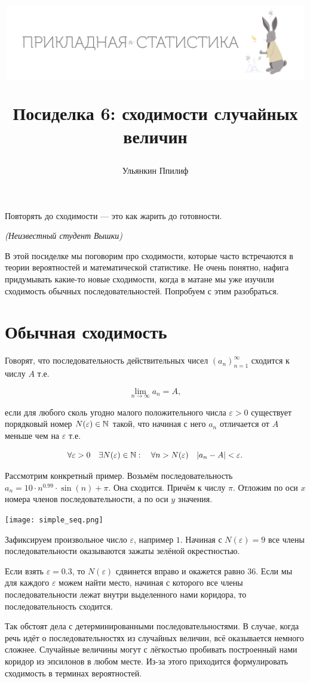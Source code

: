 \documentclass[12pt, a4paper, oneside]{article}
\title{
\begin{center} 
\includegraphics[width=0.99\textwidth]{logo.png}
\end{center}

Посиделка 6: сходимости случайных величин}
\date{ } %
\author{Ульянкин Ппилиф}
\begin{document}

\maketitle

\epigraph{Повторять до сходимости --- это как жарить до готовности.}{\textit{(Неизвестный студент Вышки)}}

В этой посиделке мы поговорим про сходимости, которые часто встречаются в теории вероятностей и математической статистике. Не очень понятно, нафига придумывать какие-то новые сходимости, когда в матане мы уже изучили сходимость обычных последовательностей. Попробуем с этим разобраться. 

\section{Обычная сходимость}

Говорят, что последовательность действительных чисел $(a_n)_{n=1}^{\infty}$ сходится к числу $A$ т.е.

\[ 
\lim_{n \to \infty} a_n = A,
\]

если для любого сколь угодно малого положительного числа $\varepsilon > 0$ существует порядковый номер $N(\varepsilon) \in \mathbb N$ такой, что начиная с него $a_n$ отличается от $A$ меньше чем на $\varepsilon$ т.е. 

\[
\forall \varepsilon > 0 \quad  \exists N(\varepsilon) \in \mathbb N : \quad  \forall n > N(\varepsilon) \quad |a_n - A| < \varepsilon.
\]

Рассмотрим конкретный пример. Возьмём последовательность $a_n = 10 \cdot n^{0.99} \cdot \sin(n) + \pi.$ Она сходится. Причём к числу $\pi$. Отложим по оси $x$ номера членов последовательности, а по оси $y$ значения. 

\begin{center} 
\texttt{[image: simple\_seq.png]}
\end{center} 

Зафиксируем произвольное число $\varepsilon$, например $1$. Начиная с $N(\varepsilon) = 9$ все члены последовательности оказываются зажаты зелёной окрестностью. 

Если взять $\varepsilon = 0.3$, то $N(\varepsilon)$ сдвинется вправо и окажется равно $36$. Если мы для каждого $\varepsilon$ можем найти место, начиная с которого все члены последовательности лежат внутри выделенного нами коридора, то последовательность сходится.

Так обстоят дела с детерминированными последовательностями. В случае, когда речь идёт о последовательностях из случайных величин, всё оказывается немного сложнее. Случайные величины могут с лёгкостью пробивать построенный нами коридор из эпсилонов в любом месте. Из-за этого приходится формулировать сходимость в терминах вероятностей. 
\end{document}
